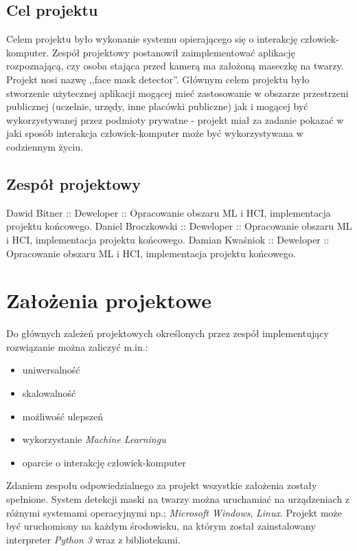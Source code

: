 \documentclass[12pt,a4paper]{article}
\begin{document}
\subsection{Cel projektu}
Celem projektu było wykonanie systemu opierającego się o interakcję człowiek-komputer. Zespół projektowy postanowił zaimplementować aplikację rozpoznającą, czy osoba stająca przed kamerą ma założoną maseczkę na twarzy. Projekt nosi nazwę ,,face mask detector''. Głównym celem projektu było stworzenie użytecznej aplikacji mogącej mieć zastosowanie w obszarze przestrzeni publicznej (uczelnie, urzędy, inne placówki publiczne) jak i mogącej być wykorzystywanej przez podmioty prywatne - projekt miał za zadanie pokazać w jaki sposób interakcja człowiek-komputer może być wykorzystywana w codziennym życiu. 

\subsection{Zespół projektowy}
Dawid Bitner    :: Deweloper   :: Opracowanie obszaru ML i HCI, implementacja projektu końcowego.\newline
Daniel Broczkowski    :: Deweloper   :: Opracowanie obszaru ML i HCI, implementacja projektu końcowego.\newline
Damian Kwaśniok    :: Deweloper   :: Opracowanie obszaru ML i HCI, implementacja projektu końcowego.

\newpage

\section{Założenia projektowe}
Do głównych zależeń projektowych określonych przez zespół implementujący rozwiązanie można zaliczyć m.in.:
\begin{itemize}
\item uniwersalność
\item skalowalność
\item możliwość ulepszeń
\item wykorzystanie \textit{Machine Learningu}
\item oparcie o interakcję człowiek-komputer
\end{itemize}

Zdaniem zespołu odpowiedzialnego za projekt wszystkie założenia zostały spełnione. System detekcji maski na twarzy można uruchamiać na urządzeniach z różnymi systemami operacyjnymi np.; \textit{Microsoft Windows}, \textit{Linux}. Projekt może być uruchomiony na każdym środowisku, na którym został zainstalowany interpreter \textit{Python 3} wraz z bibliotekami.
\end{document}
